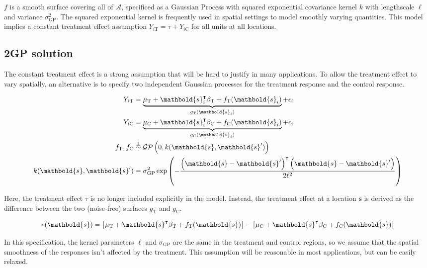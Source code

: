 \documentclass[letter]{article}
\newcommand{\gp}{\mathcal{GP}}
\newcommand{\trans}{^{\intercal}}
\newcommand{\area}{\mathcal{A}}
\newcommand{\treat}{\mathrm{T}}
\newcommand{\ctrol}{\mathrm{C}}
\newcommand{\sigmaf}{\sigma_{\mathrm{GP}}}
\newcommand{\svec}{\mathbold{s}}
\newcommand{\indep}{\protect\mathpalette{\protect\independenT}{\perp}}
\def\independenT#1#2{\mathrel{\rlap{$#1#2$}\mkern2mu{#1#2}}}
\newcommand{\eqlabel}[1]{\label{#1}}
\begin{document}
\(f\) is a smooth surface covering all of \(\area\), specificed as a Gaussian Process with squared exponential covariance kernel \(k\) with lengthscale \(\ell\) and variance \(\sigmaf^2\).
The squared exponential kernel is frequently used in spatial settings to model smoothly varying quantities.
This model implies a constant treatment effect assumption \(Y_{i\treat} = \tau + Y_{i\ctrol}\) for all units at all locations.
    


    	\subsection{2GP solution}\label{gp-solution}
    

\label{sec:twogp}
    	The constant treatment effect is a strong assumption that will be hard to justify in many applications. To allow the treatment effect to vary spatially, an alternative is to specify two independent Gaussian processes for the treatment response and the control response.

\begin{equation}
\begin{split}
Y_{i\treat} &= \underbrace{\mu_\treat{} + \svec_i\trans\beta_\treat{} + f_\treat{}(\svec_i)}_{g_\treat{}(\svec_i)} + \epsilon_i \\
Y_{i\ctrol} &= \underbrace{\mu_\ctrol{} + \svec_i\trans\beta_\ctrol{} + f_\ctrol{}(\svec_i)}_{g_\ctrol{}(\svec_i)} + \epsilon_i \\
f_\treat{}, f_\ctrol{} &\overset{\indep}{\sim} \gp\del{0, k(\svec, \svec')} \\
k(\svec,\svec') &= \sigmaf^2 \exp\del{ - \frac{\del{\svec-\svec'}\trans\del{\svec-\svec'}}{2 \ell^2}}
\end{split}
\eqlabel{eq:spec2gp}
\end{equation}

Here, the treatment effect \(\tau\) is no longer included explicitly in the model. Instead, the treatment effect at a location \(\svec\) is derived as the difference between the two (noise-free) surfaces \(g_\treat{}\) and \(g_\ctrol{}\).

\begin{equation}
\tau(\svec) = \sbr{\mu_\treat{} + \svec\trans\beta_\treat{} + f_\treat{}(\svec)} - \sbr{\mu_\ctrol{} + \svec\trans\beta_\ctrol{} + f_\ctrol{}(\svec)}
\end{equation}

In this specification, the kernel parameters \(\ell\) and \(\sigmaf\) are the same in the treatment and control regions, so we assume that the spatial smoothness of the responses isn't affected by the treatment. This assumption will be reasonable in most applications, but can be easily relaxed.
    
\end{document}
